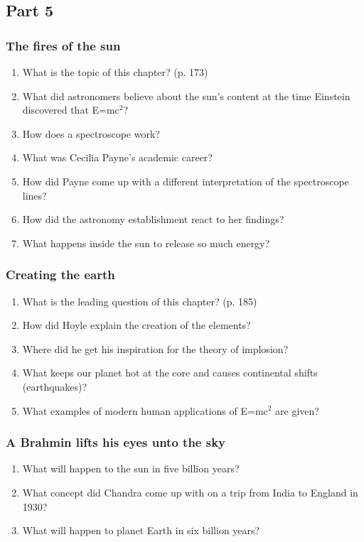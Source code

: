 \newpage
\subsection*{Part 5}
\subsubsection*{The fires of the sun}
\begin{enumerate}  
\item What is the topic of this chapter? (p. 173)
\item What did astronomers believe about the sun’s content at the time Einstein discovered that E=mc$^2$? 
\item How does a spectroscope work?
\item What was Cecilia Payne’s academic career?
\item How did Payne come up with a different interpretation of the spectroscope lines?
\item How did the astronomy establishment react to her findings?
\item What happens inside the sun to release so much energy?
\end{enumerate}

\subsubsection*{Creating the earth}
\begin{enumerate}  
\item What is the leading question of this chapter? (p. 185)
\item How did Hoyle explain the creation of the elements? 
\item Where did he get his inspiration for the theory of implosion?
\item What keeps our planet hot at the core and causes continental shifts (earthquakes)?
\item What examples of modern human applications of E=mc$^2$ are given?
\end{enumerate}

\subsubsection*{A Brahmin lifts his eyes unto the sky}
\begin{enumerate}  
\item What will happen to the sun in five billion years?
\item What concept did Chandra come up with on a trip from India to England in 1930? 
\item What will happen to planet Earth in six billion years?
\end{enumerate}



